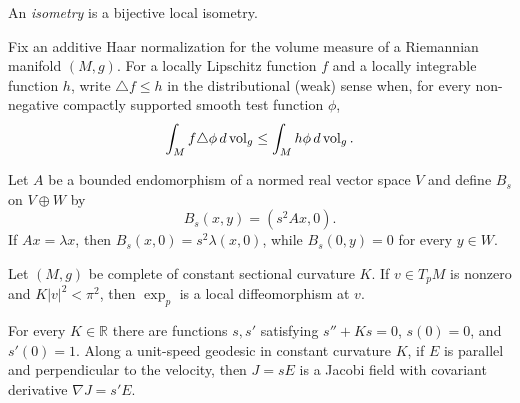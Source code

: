 %
%

\begin{definition}[Isometry]
\label{def:isometry}


An {\sl isometry} is a bijective local isometry.
\end{definition}

\begin{definition}
\label{def:weak-laplacian}


Fix an additive Haar normalization for the volume measure of a Riemannian
manifold $(M,g)$.  For a locally Lipschitz function $f$ and a locally
integrable function $h$, write $\triangle f\le h$ in the distributional
(weak) sense when, for every non-negative compactly supported smooth test
function $\phi$,
$$\int_M f\triangle \phi\,d\operatorname{vol}_g\le
\int_M h\phi\,d\operatorname{vol}_g.$$
\end{definition}

\begin{lemma}
\label{lem:abstract-cone-curvature-block}


Let $A$ be a bounded endomorphism of a normed real vector space $V$ and define
$B_s$ on $V\oplus W$ by
$$B_s(x,y)=(s^2Ax,0).$$
If $Ax=\lambda x$, then
$B_s(x,0)=s^2\lambda(x,0)$, while $B_s(0,y)=0$ for every $y\in W$.
\end{lemma}

\begin{lemma}
\label{lem:constant-curvature-exp-nonsingular-nonzero}


Let $(M,g)$ be complete of constant sectional curvature $K$.
If $v\in T_pM$ is nonzero and $K|v|^2<\pi^2$, then $\exp_p$ is a
local diffeomorphism at $v$.
\end{lemma}

\begin{lemma}
\label{lem:constant-curvature-normal-jacobi-profile}


For every $K\in\mathbb R$ there are functions $s,s'$ satisfying
$s''+Ks=0$, $s(0)=0$, and $s'(0)=1$.  Along a unit-speed geodesic
in constant curvature $K$, if $E$ is parallel and perpendicular to
the velocity, then $J=sE$ is a Jacobi field with covariant derivative
$\nabla J=s'E$.
\end{lemma}

